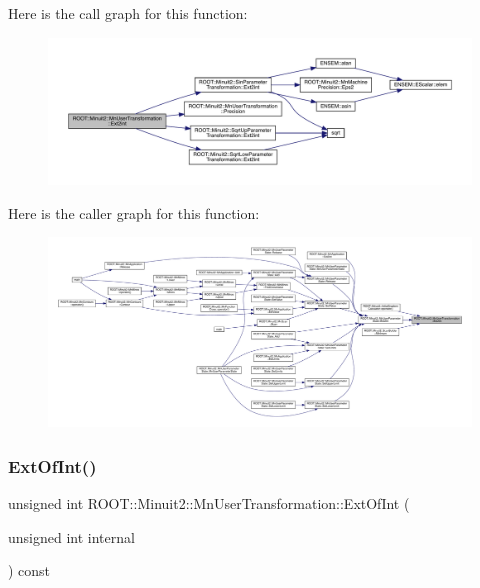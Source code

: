 Here is the call graph for this function\+:\nopagebreak
\begin{figure}[H]
\begin{center}
\leavevmode
\includegraphics[width=350pt]{d9/d98/classROOT_1_1Minuit2_1_1MnUserTransformation_a0296bec1f14bc7ee514527b88aff0760_cgraph}
\end{center}
\end{figure}
Here is the caller graph for this function\+:\nopagebreak
\begin{figure}[H]
\begin{center}
\leavevmode
\includegraphics[width=350pt]{d9/d98/classROOT_1_1Minuit2_1_1MnUserTransformation_a0296bec1f14bc7ee514527b88aff0760_icgraph}
\end{center}
\end{figure}
\mbox{\label{classROOT_1_1Minuit2_1_1MnUserTransformation_a114bf6d4e97b6f8bf5f3788e30e63002}} 
\subsubsection{\texorpdfstring{ExtOfInt()}{ExtOfInt()}\hspace{0.1cm}{\footnotesize\ttfamily [1/2]}}
{\footnotesize\ttfamily unsigned int R\+O\+O\+T\+::\+Minuit2\+::\+Mn\+User\+Transformation\+::\+Ext\+Of\+Int (\begin{DoxyParamCaption}\item[{unsigned int}]{internal }\end{DoxyParamCaption}) const\hspace{0.3cm}{\ttfamily [inline]}}

